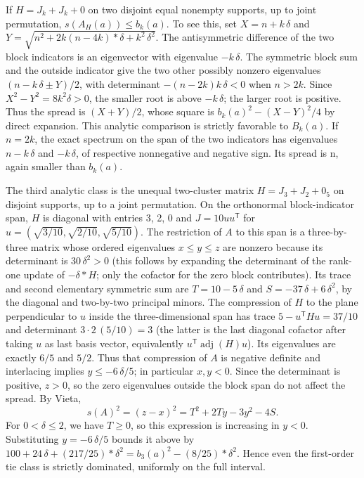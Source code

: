 \documentclass[11pt]{article}
\begin{document}
If \(H=J_k+J_k+0\) on two disjoint equal nonempty supports, up to joint permutation, \(s(A_H(a))\le b_k(a)\). To see this, set \(X=n+k\,\delta\) and \(Y=\sqrt{n^2+2k(n-4k)*\delta +k^2\,\delta ^2}\). The antisymmetric difference of the two block indicators is an eigenvector with eigenvalue \(-k\,\delta\). The symmetric block sum and the outside indicator give the two other possibly nonzero eigenvalues \((n-k\,\delta  \pm  Y)/2\), with determinant \(-(n-2k)k\,\delta <0\) when \(n>2k\). Since \(X^2-Y^2=8k^2\delta>0\), the smaller root is above \(-k\,\delta\); the larger root is positive. Thus the spread is \((X+Y)/2\), whose square is \(b_k(a)^2-(X-Y)^2/4\) by direct expansion. This analytic comparison is strictly favorable to \(B_k(a)\). If \(n=2k\), the exact spectrum on the span of the two indicators has eigenvalues \(n-k\,\delta\) and \(-k\,\delta\), of respective nonnegative and negative sign. Its spread is n, again smaller than \(b_k(a)\).

The third analytic class is the unequal two-cluster matrix \(H=J_3+J_2+0_5\) on disjoint supports, up to a joint permutation. On the orthonormal block-indicator span, \(H\) is diagonal with entries 3, 2, 0 and \(J=10 uu^{\mathsf T}\) for \(u=(\sqrt{3/10},\sqrt{2/10},\sqrt{5/10})\). The restriction of \(A\) to this span is a three-by-three matrix whose ordered eigenvalues \(x\le y\le z\) are nonzero because its determinant is \(30\,\delta ^2>0\) (this follows by expanding the determinant of the rank-one update of \(-\delta *H\); only the cofactor for the zero block contributes). Its trace and second elementary symmetric sum are \(T=10-5\,\delta\) and \(S=-37\,\delta +6\,\delta ^2\), by the diagonal and two-by-two principal minors. The compression of \(H\) to the plane perpendicular to \(u\) inside the three-dimensional span has trace \(5-u^{\mathsf T}Hu=37/10\) and determinant \(3\cdot 2\,(5/10)=3\) (the latter is the last diagonal cofactor after taking \(u\) as last basis vector, equivalently \(u^{\mathsf T} \operatorname{adj}(H)u\)). Its eigenvalues are exactly \(6/5\) and \(5/2\). Thus that compression of \(A\) is negative definite and interlacing implies \(y\le -6\,\delta /5\); in particular \(x,y<0\). Since the determinant is positive, \(z>0\), so the zero eigenvalues outside the block span do not affect the spread. By Vieta,
\[
s(A)^2=(z-x)^2=T^2+2Ty-3y^2-4S.
\]
For \(0<\delta \le 2\), we have \(T\ge 0\), so this expression is increasing in \(y<0\). Substituting \(y=-6\,\delta /5\) bounds it above by \(100+24\,\delta +(217/25)*\delta ^2 = b_3(a)^2-(8/25)*\delta ^2\). Hence even the first-order tie class is strictly dominated, uniformly on the full interval.
\end{document}
